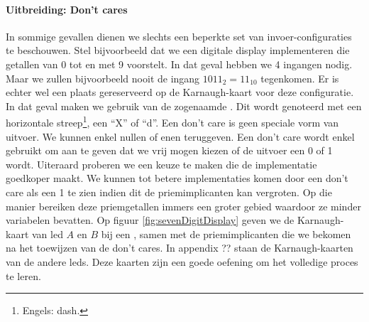 \paragraph{Uitbreiding: Don't cares}
\label{par:dontcare}
In sommige gevallen dienen we slechts een beperkte set van invoer-configuraties te beschouwen. Stel bijvoorbeeld dat we een digitale display implementeren die getallen van 0 tot en met 9 voorstelt. In dat geval hebben we 4 ingangen nodig. Maar we zullen bijvoorbeeld nooit de ingang $1011_2=11_{10}$ tegenkomen. Er is echter wel een plaats gereserveerd op de Karnaugh-kaart voor deze configuratie. In dat geval maken we gebruik van de zogenaamde . Dit wordt genoteerd met een horizontale streep\footnote{Engels: dash.}, een ``X'' of ``d''. Een don't care is geen speciale vorm van uitvoer. We kunnen enkel nullen of enen teruggeven. Een don't care wordt enkel gebruikt om aan te geven dat we vrij mogen kiezen of de uitvoer een 0 of 1 wordt. Uiteraard proberen we een keuze te maken die de implementatie goedkoper maakt. We kunnen tot betere implementaties komen door een don't care als een 1 te zien indien dit de priemimplicanten kan vergroten. Op die manier bereiken deze priemgetallen immers een groter gebied waardoor ze minder variabelen bevatten. Op figuur \ref{fig:sevenDigitDisplay} geven we de Karnaugh-kaart van led $A$ en $B$ bij een , samen met de priemimplicanten die we bekomen na het toewijzen van de don't cares. In appendix ?? staan de Karnaugh-kaarten van de andere leds. Deze kaarten zijn een goede oefening om het volledige proces te leren.
